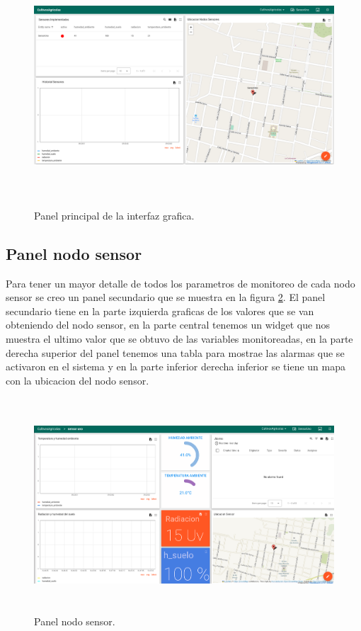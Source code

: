 \begin{figure}[h!]
  \centering
	\includegraphics[width=\textwidth, height=9cm]{./Figures/panel_principal.png}
  \caption{Panel principal de la interfaz grafica.}
	\label{fig:Panel principal}
\end{figure}

\clearpage
\subsection{Panel nodo sensor} 

Para tener un mayor detalle de todos los parametros de monitoreo de cada nodo sensor se creo un panel secundario que se muestra en la figura \ref{fig:Panel nodo sensor}.
El panel secundario tiene en la parte izquierda graficas de los valores que se van obteniendo del nodo sensor, en la parte central tenemos un widget que nos muestra el ultimo valor que se obtuvo de las variables monitoreadas, en la parte derecha superior del panel tenemos una tabla para mostrae las alarmas que se activaron en el sistema y en la parte inferior derecha inferior se tiene un mapa con la ubicacion del nodo sensor.  

\begin{figure}[h!]
  \centering
	\includegraphics[width=\textwidth, height=8cm]{./Figures/panel_nodosensor.png}
  \caption{Panel nodo sensor.}
	\label{fig:Panel nodo sensor}
\end{figure}